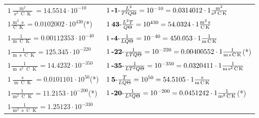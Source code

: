 \begin{center}
\begin{longtable}{l l}
{\color{black}$1 \bm{\mathrm{ }}\frac{\operatorname{m}^2}{\operatorname{s}^2\operatorname{C}\operatorname{K}} = 14.5514\cdot10^{-10} $}&
	{\color{black}$1\:\text{\textbf{-1}-} \frac{L^2}{T^2Q\Theta}=10^{-10} = 0.0314012 \cdot 1 \bm{\mathrm{ }}\frac{\operatorname{m}^2}{\operatorname{s}^2\operatorname{C}\operatorname{K}}$}\\
{\color{black}$1 \bm{\mathrm{ }}\frac{\operatorname{m}^2\operatorname{s}}{\operatorname{C}\operatorname{K}} = 0.0102002\cdot10^{430} $}\quad(*)&
	{\color{black}$1\:\text{\textbf{43}-} \frac{L^2T}{Q\Theta}=10^{430} = 54.0324 \cdot 1 \bm{\mathrm{ }}\frac{\operatorname{m}^2\operatorname{s}}{\operatorname{C}\operatorname{K}}$}\\
{\color{black}$1 \bm{\mathrm{ }}\frac1{\operatorname{m}\operatorname{C}\operatorname{K}} = 0.00112353\cdot10^{-40} $}&
	{\color{black}$1\:\text{\textbf{-4}-} \frac1{LQ\Theta}=10^{-40} = 450.053 \cdot 1 \bm{\mathrm{ }}\frac1{\operatorname{m}\operatorname{C}\operatorname{K}}$}\\
{\color{black}$1 \bm{\mathrm{ }}\frac1{\operatorname{m}\operatorname{s}\operatorname{C}\operatorname{K}} = 125.345\cdot10^{-220} $}&
	{\color{black}$1\:\text{\textbf{-22}-} \frac1{LTQ\Theta}=10^{-220} = 0.00400552 \cdot 1 \bm{\mathrm{ }}\frac1{\operatorname{m}\operatorname{s}\operatorname{C}\operatorname{K}}$}\quad(*)\\
{\color{black}$1 \bm{\mathrm{ }}\frac1{\operatorname{m}\operatorname{s}^2\operatorname{C}\operatorname{K}} = 14.4232\cdot10^{-350} $}&
	{\color{black}$1\:\text{\textbf{-35}-} \frac1{LT^2Q\Theta}=10^{-350} = 0.0320411 \cdot 1 \bm{\mathrm{ }}\frac1{\operatorname{m}\operatorname{s}^2\operatorname{C}\operatorname{K}}$}\\
{\color{black}$1 \bm{\mathrm{ }}\frac{\operatorname{s}}{\operatorname{m}\operatorname{C}\operatorname{K}} = 0.0101101\cdot10^{50} $}\quad(*)&
	{\color{black}$1\:\text{\textbf{5}-} \frac{T}{LQ\Theta}=10^{50} = 54.5105 \cdot 1 \bm{\mathrm{ }}\frac{\operatorname{s}}{\operatorname{m}\operatorname{C}\operatorname{K}}$}\\
{\color{black}$1 \bm{\mathrm{ }}\frac1{\operatorname{m}^2\operatorname{C}\operatorname{K}} = 11.2153\cdot10^{-200} $}\quad(*)&
	{\color{black}$1\:\text{\textbf{-20}-} \frac1{L^2Q\Theta}=10^{-200} = 0.0451242 \cdot 1 \bm{\mathrm{ }}\frac1{\operatorname{m}^2\operatorname{C}\operatorname{K}}$}\quad(*)\\
{\color{black}$1 \bm{\mathrm{ }}\frac1{\operatorname{m}^2\operatorname{s}\operatorname{C}\operatorname{K}} = 1.25123\cdot10^{-330} $}&

\end{longtable}
\end{center}
